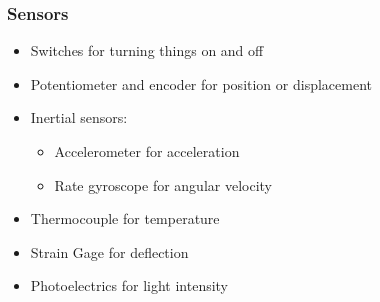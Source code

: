 \documentclass[11pt]{article}
\begin{document}
 \newpage

\subsubsection{Sensors}
\label{sec:orgb265303}
\begin{itemize}
\item Switches for turning things on and off
\item Potentiometer and encoder for position or displacement
\item Inertial sensors:
\begin{itemize}
\item Accelerometer for acceleration
\item Rate gyroscope for angular velocity
\end{itemize}
\item Thermocouple for temperature
\item Strain Gage for deflection
\item Photoelectrics for light intensity
\end{itemize}

 \newpage
\end{document}
